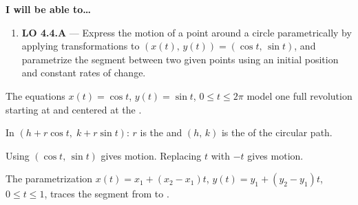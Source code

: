 \documentclass[10pt]{article}
\begin{document}
\namedateperiod

\vspace{0.08in}

\begin{objectivebox}
\textbf{I will be able to\ldots}
\begin{enumerate}[leftmargin=1.5em, itemsep=4pt]
  \item \textbf{LO 4.4.A} --- Express the motion of a point around a
    circle parametrically by applying transformations to
    $(x(t),\,y(t)) = (\cos t,\,\sin t)$, and parametrize the segment
    between two given points using an initial position and constant
    rates of change. \writeline
\end{enumerate}
\end{objectivebox}

\vspace{0.08in}

\begin{vocabbox}
\begin{description}[leftmargin=0pt, itemsep=6pt]
  \item[\termblanklong{unit circle parametrization}]
    The equations $x(t) = \cos t$, $y(t) = \sin t$, $0 \le t \le 2\pi$
    model one full \underline{\hspace{3cm}} revolution starting at
    \underline{\hspace{2cm}} and centered at the \underline{\hspace{2cm}}.

  \item[\termblanklong{radius / center}]
    In $(h + r\cos t,\; k + r\sin t)$: $r$ is the
    \underline{\hspace{2cm}} and $(h,\,k)$ is the
    \underline{\hspace{2cm}} of the circular path.

  \item[\termblanklong{orientation}]
    Using $(\cos t,\,\sin t)$ gives \underline{\hspace{3cm}} motion.
    Replacing $t$ with $-t$ gives \underline{\hspace{3cm}} motion.

  \item[\termblanklong{linear parametrization}]
    The parametrization $x(t) = x_1 + (x_2-x_1)t$,
    $y(t) = y_1 + (y_2-y_1)t$, $0\le t\le 1$, traces the segment from
    \underline{\hspace{2.5cm}} to \underline{\hspace{2.5cm}}.
\end{description}
\end{vocabbox}
\end{document}

